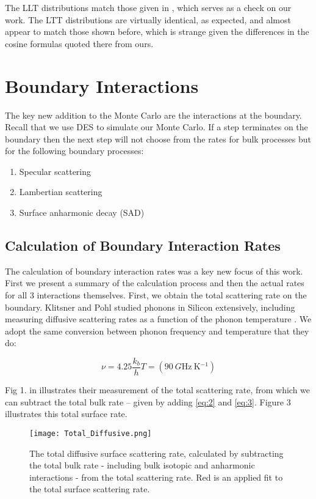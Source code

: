 \documentclass[11pt]{article}
\begin{document}
The LLT distributions match those given in \cite{1}, which serves as a check on our work. The LTT distributions are virtually identical, as expected,
and almost appear to match those shown before, which is strange given the differences in the cosine formulas quoted there from ours. 

\section*{Boundary Interactions}
The key new addition to the Monte Carlo are the interactions at the boundary. Recall that we use DES to simulate our Monte Carlo. If a step terminates
on the boundary then the next step will not choose from the rates for bulk processes but for the following boundary processes:

\begin{enumerate}
\item Specular scattering
\item Lambertian scattering
\item Surface anharmonic decay (SAD)
\end{enumerate}

\subsection*{Calculation of Boundary Interaction Rates}

The calculation of boundary interaction rates was a key new focus of this work. First we present a summary of the calculation process and then 
the actual rates for all 3 interactions themselves. First, we obtain the total scattering rate on the boundary. Klitsner and Pohl studied phonons
in Silicon extensively, including measuring diffusive scattering rates as a function of the phonon temperature \cite{4}. We adopt the same 
conversion between phonon frequency and temperature that they do:

\begin{equation}
\nu = 4.25 \frac{k_b}{h} T = (90 \ \si{G\hertz \ \kelvin^{-1}})\label{eq:10}
\end{equation}

Fig 1. in \cite{4} illustrates their measurement of the total scattering rate, from which we can subtract the total bulk rate -- given by
adding \eqref{eq:2} and \eqref{eq:3}. Figure 3 illustrates this total surface rate.

\begin{figure}[!h]
\centering
\texttt{[image: Total\_Diffusive.png]}
\caption{The total diffusive surface scattering rate, calculated by subtracting the total bulk rate - including bulk isotopic and anharmonic 
interactions - from the total scattering rate. Red is an applied fit to the total surface scattering rate.}
\end{figure}
\end{document}
